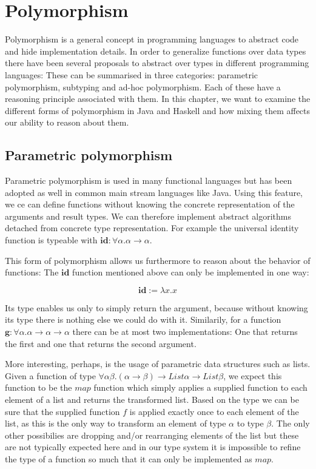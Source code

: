 \chapter{Polymorphism}
\label{ch:polymorphism}

Polymorphism is a general concept in programming languages to abstract code and hide implementation details.
In order to generalize functions over data types there have been several proposals to abstract over types in different programming languages:
These can be summarised in three categories: parametric polymorphism, subtyping and ad-hoc polymorphism.
Each of these have a reasoning principle associated with them.
In this chapter, we want to examine the different forms of polymorphism in Java and Haskell and how mixing them affects our ability to reason about them.

\section{Parametric polymorphism}\label{sec:parmetric-polymorphism}

Parametric polymorphism is used in many functional languages but has been adopted as well in common main stream languages like Java.
Using this feature, we ce can define functions without knowing the concrete representation of the arguments and result types.
We can therefore implement abstract algorithms detached from concrete type representation.
For example the universal identity function is typeable with $\mathbf{id} : \forall \alpha. \alpha \to \alpha$.

This form of polymorphism allows us furthermore to reason about the behavior of functions:
The $\mathbf{id}$ function mentioned above can only be implemented in one way:

$$
  \mathbf{id} := \lambda x.x
$$

Its type enables us only to simply return the argument, because without knowing its type there is nothing else we could do with it.
Similarily, for a function $\mathbf{g} : \forall \alpha. \alpha \to \alpha \to \alpha$ there can be at most two implementations:
One that returns the first and one that returns the second argument.

More interesting, perhaps, is the usage of parametric data structures such as lists.
Given a function of type $\forall \alpha \beta. (\alpha \to \beta) \to \mathit{List } \alpha \to \mathit{List } \beta$, we expect this function to be the $\mathit{map}$ function which simply applies a supplied function to each element of a list and returns the transformed list.
Based on the type we can be sure that the supplied function $f$ is applied exactly once to each element of the list, as this is the only way to transform an element of type $\alpha$ to type $\beta$.
The only other possibilies are dropping and/or rearranging elements of the list but these are not typically expected here and in our type system it is impossible to refine the type of a function so much that it can only be implemented as $\mathit{map}$.

